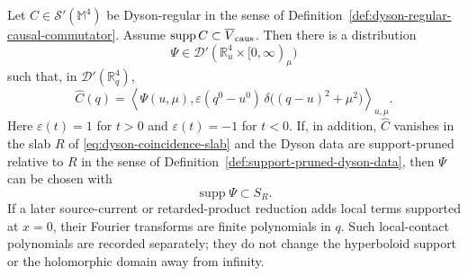 \begin{theorem}
\label{thm:dyson-causal-commutator-representation}
Let \(C\in\mathcal S'(\mathbb M^4)\) be Dyson-regular in the sense of
Definition~\ref{def:dyson-regular-causal-commutator}.  Assume
\(\operatorname{supp}C\subset\overline V_{\rm caus}\).  Then there is a
distribution
\[
  \Psi\in\mathcal D'(\mathbb R^4_u\times[0,\infty)_\mu)
\]
such that, in \(\mathcal D'(\mathbb R^4_q)\),
\begin{equation}
  \widehat C(q)
  =
  \left\langle
    \Psi(u,\mu),
    \varepsilon(q^0-u^0)\,
    \delta\!\bigl((q-u)^2+\mu^2\bigr)
  \right\rangle_{u,\mu}.
  \label{eq:dyson-causal-commutator-representation}
\end{equation}
Here \(\varepsilon(t)=1\) for \(t>0\) and \(\varepsilon(t)=-1\) for
\(t<0\).  If, in addition, \(\widehat C\) vanishes in the slab \(R\) of
\eqref{eq:dyson-coincidence-slab} and the Dyson data are support-pruned
relative to \(R\) in the sense of
Definition~\ref{def:support-pruned-dyson-data}, then \(\Psi\) can be chosen
with
\[
  \operatorname{supp}\Psi\subset S_R .
\]
If a later source-current or retarded-product reduction adds local terms
supported at \(x=0\), their Fourier transforms are finite polynomials in
\(q\).  Such local-contact polynomials are recorded separately; they do not
change the hyperboloid support or the holomorphic domain away from infinity.
\end{theorem}

